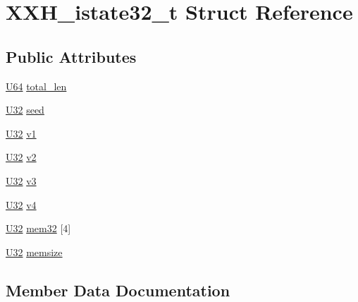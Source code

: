 \hypertarget{struct_x_x_h__istate32__t}{}\section{X\+X\+H\+\_\+istate32\+\_\+t Struct Reference}
\label{struct_x_x_h__istate32__t}
\subsection*{Public Attributes}
\begin{DoxyCompactItemize}
\item 
\hyperlink{xxhash_8c_a24c386d3758eba951eb7532fdbb45804}{U64} \hyperlink{struct_x_x_h__istate32__t_a8b358b224ecd8fe9412e90d1bc7d0261}{total\+\_\+len}
\item 
\hyperlink{xxhash_8c_ac3df7cf3c8cb172a588adec881447d68}{U32} \hyperlink{struct_x_x_h__istate32__t_aa838ccfe91463ae3508ca756efdd3ca5}{seed}
\item 
\hyperlink{xxhash_8c_ac3df7cf3c8cb172a588adec881447d68}{U32} \hyperlink{struct_x_x_h__istate32__t_abe7ccbc29303d4f4126d7c1c6003e67a}{v1}
\item 
\hyperlink{xxhash_8c_ac3df7cf3c8cb172a588adec881447d68}{U32} \hyperlink{struct_x_x_h__istate32__t_a2e56f8d3931253d5706f6354c228e7c4}{v2}
\item 
\hyperlink{xxhash_8c_ac3df7cf3c8cb172a588adec881447d68}{U32} \hyperlink{struct_x_x_h__istate32__t_ae19dc091e2c1c51e516024137603cd4a}{v3}
\item 
\hyperlink{xxhash_8c_ac3df7cf3c8cb172a588adec881447d68}{U32} \hyperlink{struct_x_x_h__istate32__t_a8ca5625843153eb81437e9cee7364c1c}{v4}
\item 
\hyperlink{xxhash_8c_ac3df7cf3c8cb172a588adec881447d68}{U32} \hyperlink{struct_x_x_h__istate32__t_a5a135d71eca5187fe5d12890cb7c76d4}{mem32} \mbox{[}4\mbox{]}
\item 
\hyperlink{xxhash_8c_ac3df7cf3c8cb172a588adec881447d68}{U32} \hyperlink{struct_x_x_h__istate32__t_ad84d2d64d2867bca27555196bff172d3}{memsize}
\end{DoxyCompactItemize}


\subsection{Member Data Documentation}
\hypertarget{struct_x_x_h__istate32__t_a5a135d71eca5187fe5d12890cb7c76d4}{}
